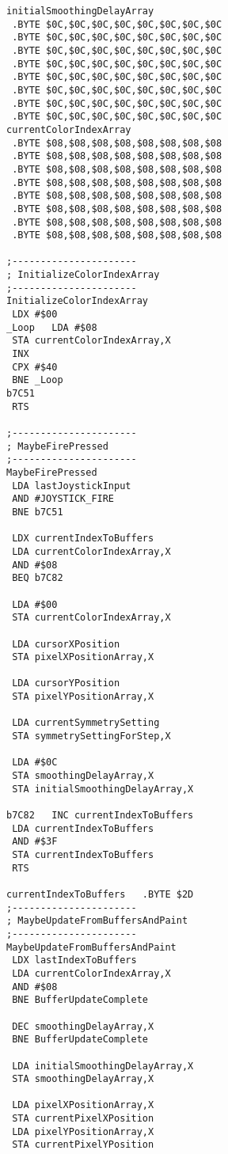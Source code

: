 \begin{minipage}[b]{0.33\linewidth}
\begin{lrbox}{\mybox}%
\begin{lstlisting}[basicstyle=\ttfamily\tiny]
initialSmoothingDelayArray   
 .BYTE $0C,$0C,$0C,$0C,$0C,$0C,$0C,$0C
 .BYTE $0C,$0C,$0C,$0C,$0C,$0C,$0C,$0C
 .BYTE $0C,$0C,$0C,$0C,$0C,$0C,$0C,$0C
 .BYTE $0C,$0C,$0C,$0C,$0C,$0C,$0C,$0C
 .BYTE $0C,$0C,$0C,$0C,$0C,$0C,$0C,$0C
 .BYTE $0C,$0C,$0C,$0C,$0C,$0C,$0C,$0C
 .BYTE $0C,$0C,$0C,$0C,$0C,$0C,$0C,$0C
 .BYTE $0C,$0C,$0C,$0C,$0C,$0C,$0C,$0C
currentColorIndexArray   
 .BYTE $08,$08,$08,$08,$08,$08,$08,$08
 .BYTE $08,$08,$08,$08,$08,$08,$08,$08
 .BYTE $08,$08,$08,$08,$08,$08,$08,$08
 .BYTE $08,$08,$08,$08,$08,$08,$08,$08
 .BYTE $08,$08,$08,$08,$08,$08,$08,$08
 .BYTE $08,$08,$08,$08,$08,$08,$08,$08
 .BYTE $08,$08,$08,$08,$08,$08,$08,$08
 .BYTE $08,$08,$08,$08,$08,$08,$08,$08

;----------------------
; InitializeColorIndexArray
;----------------------
InitializeColorIndexArray   
 LDX #$00
_Loop   LDA #$08
 STA currentColorIndexArray,X
 INX 
 CPX #$40
 BNE _Loop
b7C51
 RTS 

;----------------------
; MaybeFirePressed
;----------------------
MaybeFirePressed   
 LDA lastJoystickInput
 AND #JOYSTICK_FIRE
 BNE b7C51

 LDX currentIndexToBuffers
 LDA currentColorIndexArray,X
 AND #$08
 BEQ b7C82

 LDA #$00
 STA currentColorIndexArray,X

 LDA cursorXPosition
 STA pixelXPositionArray,X

 LDA cursorYPosition
 STA pixelYPositionArray,X

 LDA currentSymmetrySetting
 STA symmetrySettingForStep,X

 LDA #$0C
 STA smoothingDelayArray,X
 STA initialSmoothingDelayArray,X

b7C82   INC currentIndexToBuffers
 LDA currentIndexToBuffers
 AND #$3F
 STA currentIndexToBuffers
 RTS 

currentIndexToBuffers   .BYTE $2D
;----------------------
; MaybeUpdateFromBuffersAndPaint
;----------------------
MaybeUpdateFromBuffersAndPaint   
 LDX lastIndexToBuffers
 LDA currentColorIndexArray,X
 AND #$08
 BNE BufferUpdateComplete

 DEC smoothingDelayArray,X
 BNE BufferUpdateComplete

 LDA initialSmoothingDelayArray,X
 STA smoothingDelayArray,X

 LDA pixelXPositionArray,X
 STA currentPixelXPosition
 LDA pixelYPositionArray,X
 STA currentPixelYPosition


\end{lstlisting}
\end{lrbox}
\end{minipage}
